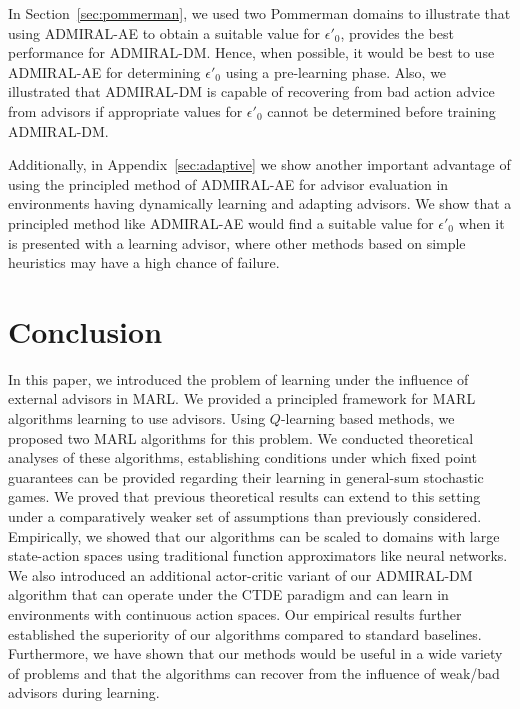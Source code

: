 \documentclass[jair, twoside,11pt,theapa]{article}
\begin{document}
In Section~\ref{sec:pommerman}, we used two Pommerman domains to illustrate that using ADMIRAL-AE to obtain a suitable value for $\epsilon'_0$, provides the best performance for ADMIRAL-DM. Hence, when possible, it would be best to use ADMIRAL-AE for determining $\epsilon'_0$ using a pre-learning phase. Also, we illustrated that ADMIRAL-DM is capable of recovering from bad action advice from advisors if appropriate values for $\epsilon'_0$ cannot be determined before training ADMIRAL-DM. 

Additionally, in Appendix~\ref{sec:adaptive} we show another important advantage of using the principled method of ADMIRAL-AE for advisor evaluation in environments having dynamically learning and adapting advisors. We show that a principled method like ADMIRAL-AE would find a suitable value for $\epsilon'_0$ when it is presented with a learning advisor, where other methods based on simple heuristics may have a high chance of failure.


\section{Conclusion}




In this paper, we introduced the problem of learning under the influence of external advisors in MARL. We provided a  principled framework for MARL algorithms learning to use advisors.
Using $Q$-learning based methods, we proposed two MARL algorithms for this problem. We conducted theoretical analyses of these algorithms, establishing conditions under which fixed point guarantees can be provided regarding their learning in general-sum stochastic games. We  proved that previous theoretical results can extend to this setting under a comparatively weaker set of assumptions than previously considered. Empirically, we showed that our algorithms can be scaled to domains with large state-action spaces using traditional function approximators like neural networks. We also introduced an additional actor-critic variant of our ADMIRAL-DM algorithm that can operate under the CTDE paradigm and can learn in environments with continuous action spaces. Our empirical results further established the superiority of our algorithms compared to standard baselines. Furthermore,  we have shown that our methods would be useful in a wide variety of problems and that the algorithms can recover from the influence of weak/bad advisors during learning. 
\end{document}
